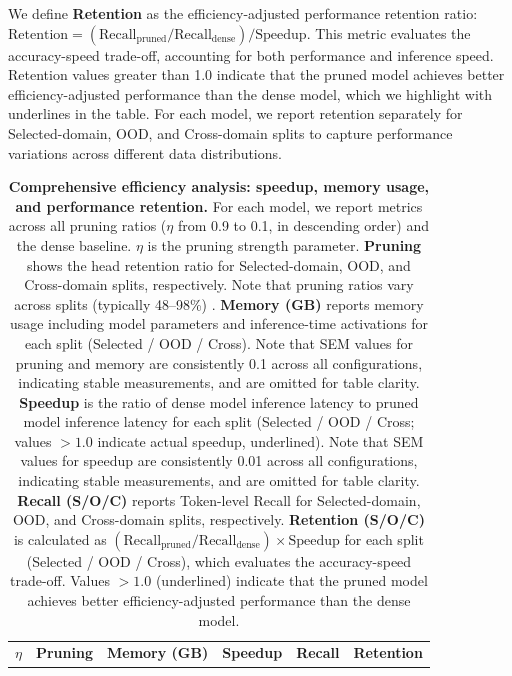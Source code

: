 We define \textbf{Retention} as the efficiency-adjusted performance retention ratio: $\text{Retention} = (\text{Recall}_{\text{pruned}} / \text{Recall}_{\text{dense}}) / \text{Speedup}$. This metric evaluates the accuracy-speed trade-off, accounting for both performance and inference speed. Retention values greater than 1.0 indicate that the pruned model achieves better efficiency-adjusted performance than the dense model, which we highlight with underlines in the table.
For each model, we report retention separately for Selected-domain, OOD, and Cross-domain splits to capture performance variations across different data distributions.

\begin{table}[!t]
\caption{\textbf{Comprehensive efficiency analysis: speedup, memory usage, and performance retention.}
For each model, we report metrics across all pruning ratios ($\eta$ from 0.9 to 0.1, in descending order) and the dense baseline.
\textbf{$\eta$} is the pruning strength parameter.
\textbf{Pruning} shows the head retention ratio for Selected-domain, OOD, and Cross-domain splits, respectively. Note that pruning ratios vary across splits (typically 48--98\%) .
\textbf{Memory (GB)} reports memory usage including model parameters and inference-time activations for each split (Selected / OOD / Cross). Note that SEM values for pruning and memory are consistently 0.1 across all configurations, indicating stable measurements, and are omitted for table clarity.
\textbf{Speedup} is the ratio of dense model inference latency to pruned model inference latency for each split (Selected / OOD / Cross; values $>1.0$ indicate actual speedup, underlined). Note that SEM values for speedup are consistently 0.01 across all configurations, indicating stable measurements, and are omitted for table clarity.
\textbf{Recall (S/O/C)} reports Token-level Recall for Selected-domain, OOD, and Cross-domain splits, respectively.
\textbf{Retention (S/O/C)} is calculated as $(\text{Recall}_{\text{pruned}} / \text{Recall}_{\text{dense}}) \times \text{Speedup}$ for each split (Selected / OOD / Cross), which evaluates the accuracy-speed trade-off. Values $>1.0$ (underlined) indicate that the pruned model achieves better efficiency-adjusted performance than the dense model.}
\centering
\footnotesize
\setlength{\tabcolsep}{1.8pt}
\renewcommand{\arraystretch}{1.05}
\begin{tabular}{c c c c c c}
\toprule
\textbf{$\eta$} & \textbf{Pruning} & \textbf{Memory (GB)} & \textbf{Speedup} & \textbf{Recall} & \textbf{Retention} \\

\end{tabular}
\end{table}
